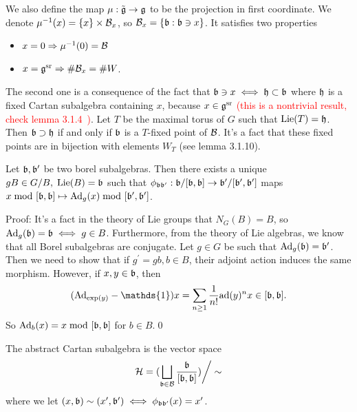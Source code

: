 We also define the map $\mu:\tilde{\mathfrak{g}}\to \mathfrak{g}$ to be the projection in first coordinate. We denote 
$\mu^{-1}(x)=\{x\}\times\mathcal{B}_x$, so $\mathcal{B}_x=\{\mathfrak{b}:\mathfrak{b}\ni x\}$. It satisfies two properties 
\begin{itemize}
    \item[(a)] $x=0\Rightarrow \mu^{-1}(0)=\mathcal{B}$
    \item[(b)] $x=\mathfrak{g}^{\text{sr}}\Rightarrow \#\mathcal{B}_x=\#W$. 
\end{itemize}
The second one is a consequence of the fact that $\mathfrak{b}\ni x\iff \mathfrak{h}\subset \mathfrak{b}$ where 
$\mathfrak{h}$ is a fixed Cartan subalgebra containing $x$, because $x\in\mathfrak{g}^{\text{sr}}$ 
\textcolor{red}{(this is a nontrivial result, check lemma 3.1.4~\cite{chriss1997representation})}. Let 
$T$ be the maximal torus of $G$ such that $\text{Lie}(T)=\mathfrak{h}$. Then $\mathfrak{b}\supset\mathfrak{h}$ if and only if 
$\mathfrak{b}$ is a $T$-fixed point of $\mathcal{B}$. It's a fact that these fixed points are in bijection with 
elements $W_T$ (see \cite{chriss1997representation} lemma 3.1.10). 
\begin{dang}
    \begin{proposition}
        Let $\mathfrak{b},\mathfrak{b}^\prime$ be two borel subalgebras. Then there exists a unique 
        $gB\in G/B,\;\text{Lie}(B)=\mathfrak{b}$ such that 
        $\phi_{\mathfrak{b}\mathfrak{b}^\prime}: \mathfrak{b}/[\mathfrak{b},\mathfrak{b}]\to \mathfrak{b}^\prime/[\mathfrak{b}^\prime,\mathfrak{b}^\prime]$
        maps $x\;\text{mod }[\mathfrak{b},\mathfrak{b}]\mapsto \text{Ad}_g(x)\;\text{mod }[\mathfrak{b}^\prime,\mathfrak{b}^\prime]$.
    \end{proposition}
\end{dang}
Proof: It's a fact in the theory of Lie groups that $N_G(B)=B$, so $\text{Ad}_g(\mathfrak{b})=\mathfrak{b}\iff g\in B$. Furthermore, from the theory 
of Lie algebras, we know that all Borel subalgebras are conjugate. Let $g\in G$ be such that $\text{Ad}_g(\mathfrak{b})=\mathfrak{b}^\prime$. Then 
we need to show that if $g^\prime = gb,b\in B$, their adjoint action induces the same morphism. However, if 
$x,y\in \mathfrak{b}$, then 
\begin{equation}
    (\Ad_{\exp(y)}-\mathds{1})x = \sum_{n\geq1}\frac{1}{n!}\ad(y)^nx\in[\fr{b},\fr{b}].
\end{equation}
So $\text{Ad}_b(x)=x\;\text{mod }[\mathfrak{b},\mathfrak{b}]$ for $b\in B$.\qed

\begin{dang}
    \begin{definition}
        The abstract Cartan subalgebra is the vector space
        \begin{equation}
        \mathcal{H} = (\bigsqcup_{\mathfrak{b}\in\mathcal{B}}\frac{\mathfrak{b}}{[\mathfrak{b},\mathfrak{b}]} )\bigg/ \sim 
        \end{equation}
        where we let $(x,\mathfrak{b})\sim (x^\prime,\mathfrak{b}^\prime)\iff \phi_{\mathfrak{b}\mathfrak{b}^\prime}(x)=x^\prime$.
    \end{definition}
\end{dang}

